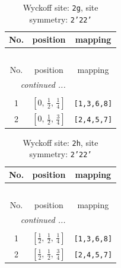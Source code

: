 \documentclass[fleqn,8pt]{jsarticle}
\begin{document}
\begin{longtable}{ccc}
\caption{Wyckoff site: {\tt 2g}, site symmetry: {\tt 2'22'}}
 \\
 \hline \hline
No. & position & mapping \\ \hline \endfirsthead

\multicolumn{2}{l}{\tablename\ \thetable{}} \\
 \hline \hline
No. & position & mapping \\ \hline \endhead

 \hline \hline
\multicolumn{2}{r}{\footnotesize\it continued ...} \\ \endfoot

 \hline \hline
\multicolumn{2}{r}{} \\ \endlastfoot

1 & $\left[ 0,\, \frac{1}{2},\, \frac{1}{4} \right]$ & {\tt [1,3,6,8]} \\ \hline
2 & $\left[ 0,\, \frac{1}{2},\, \frac{3}{4} \right]$ & {\tt [2,4,5,7]} \\
\end{longtable}
\renewcommand{\arraystretch}{1.2}
\begin{longtable}{ccc}
\caption{Wyckoff site: {\tt 2h}, site symmetry: {\tt 2'22'}}
 \\
 \hline \hline
No. & position & mapping \\ \hline \endfirsthead

\multicolumn{2}{l}{\tablename\ \thetable{}} \\
 \hline \hline
No. & position & mapping \\ \hline \endhead

 \hline \hline
\multicolumn{2}{r}{\footnotesize\it continued ...} \\ \endfoot

 \hline \hline
\multicolumn{2}{r}{} \\ \endlastfoot

1 & $\left[ \frac{1}{2},\, \frac{1}{2},\, \frac{1}{4} \right]$ & {\tt [1,3,6,8]} \\ \hline
2 & $\left[ \frac{1}{2},\, \frac{1}{2},\, \frac{3}{4} \right]$ & {\tt [2,4,5,7]} \\
\end{longtable}
\renewcommand{\arraystretch}{1.2}
\end{document}
